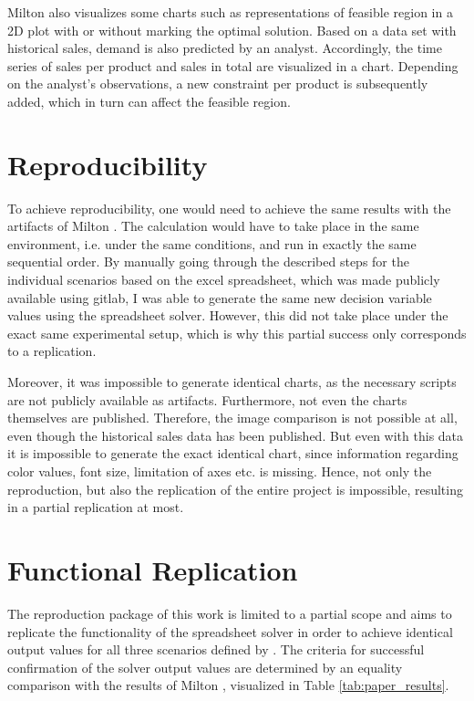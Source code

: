 \documentclass[sigconf, nonacm]{acmart}
\begin{document}
Milton \cite{Milton2009} also visualizes some charts such as representations of feasible region in a 2D plot with or without marking the optimal solution. Based on a data set with historical sales, demand is also predicted by an analyst. Accordingly, the time series of sales per product and sales in total are visualized in a chart. Depending on the analyst's observations, a new constraint per product is subsequently added, which in turn can affect the feasible region.



\section{Reproducibility}
To achieve reproducibility, one would need to achieve the same results with the artifacts of Milton \cite{Milton2009}. The calculation would have to take place in the same environment, i.e. under the same conditions, and run in exactly the same sequential order. By manually going through the described steps for the individual scenarios based on the excel spreadsheet, which was made publicly available using gitlab, I was able to generate the same new decision variable values using the spreadsheet solver. However, this did not take place under the exact same experimental setup, which is why this partial success only corresponds to a replication.


Moreover, it was impossible to generate identical charts, as the necessary scripts are not publicly available as artifacts. Furthermore, not even the charts themselves are published. Therefore, the image comparison is not possible at all, even though the historical sales data has been published. But even with this data it is impossible to generate the exact identical chart, since information regarding color values, font size, limitation of axes etc. is missing. Hence, not only the reproduction, but also the replication of the entire project is impossible, resulting in a partial replication at most.

\section{Functional Replication}
The reproduction package of this work is limited to a partial scope and aims to replicate the functionality of the spreadsheet solver in order to achieve identical output values for all three scenarios defined by \cite{Milton2009}. The criteria for successful confirmation of the solver output values are determined by an equality comparison with the results of Milton \cite{Milton2009}, visualized in Table \ref{tab:paper_results}.
\end{document}
